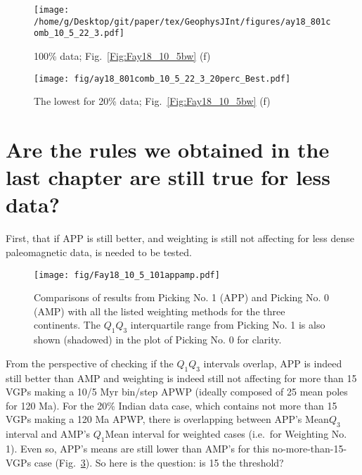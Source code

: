 \begin{figure*}[tbp]
  \captionsetup[subfigure]{labelformat=empty,aboveskip=-6pt,belowskip=-6pt}
  \centering
  \begin{subfigure}[htbp]{.49\textwidth}
    \captionsetup{skip=0pt}
    \centering
    \texttt{[image: /home/g/Desktop/git/paper/tex/GeophysJInt/figures/ay18\_801comb\_10\_5\_22\_3.pdf]}
	\caption{100\% data; Fig.~\ref{Fig:Fay18_10_5bw}
	(f)}\label{Fig:Fay18_10_5w801}
  \end{subfigure}
  \begin{subfigure}[htbp]{.49\textwidth}
    \captionsetup{skip=0pt}
    \centering
    \texttt{[image: fig/ay18\_801comb\_10\_5\_22\_3\_20perc\_Best.pdf]} %
    \caption{The lowest for 20\% data;
	Fig.~\ref{Fig:Fay18_10_5bw} (f)}\label{Fig:Fay18_10_5w801l20p}
  \end{subfigure}
  \caption[Less data, better similarity?]{Comparing the 100\% Australian
  120 Ma paleomagnetic data derived result with the best of the only
  20\% data derived results (the dark green dot in Fig.~\ref{Fig:Fay18_10_5bw}
  (f)).}\label{Fig:Fay18_10_5w801l20p_vs_100p}
\end{figure*}

\section{Are the rules we obtained in the last chapter are still true for less
data?}

First, that if APP is still better, and weighting is still not affecting for
less dense paleomagnetic data, is needed to be tested.

\begin{figure}
    \centering
        \texttt{[image: fig/Fay18\_10\_5\_101appamp.pdf]}
    \captionsetup{width=1\textwidth}
    \caption{Comparisons of results from Picking No. 1 (APP) and Picking No. 0
	(AMP) with all the listed weighting methods for the three continents. The
	$Q_1$\textendash$Q_3$ interquartile range from Picking No. 1 is also shown
	(shadowed) in the plot of Picking No. 0 for clarity.}\label{Fig:Fay18_10_5_101appamp}
\end{figure}

From the perspective of checking if the $Q_1$\textendash$Q_3$ intervals overlap,
APP is indeed still better than AMP and weighting is indeed still not affecting
for more than 15 VGPs making a 10/5 Myr bin/step APWP (ideally composed of 25
mean poles for 120 Ma). For the 20\% Indian data case, which
contains not more than 15 VGPs making a 120 Ma APWP, there is
overlapping between APP's Mean\textendash$Q_3$ interval and AMP's
$Q_1$\textendash{}Mean interval for weighted cases (i.e.\ for Weighting No.
1). Even so, APP's means are still lower than AMP's for this
no-more-than-15-VGPs case (Fig.~\ref{Fig:Fay18_10_5_101appamp}). So here is the
question: is 15 the threshold?
